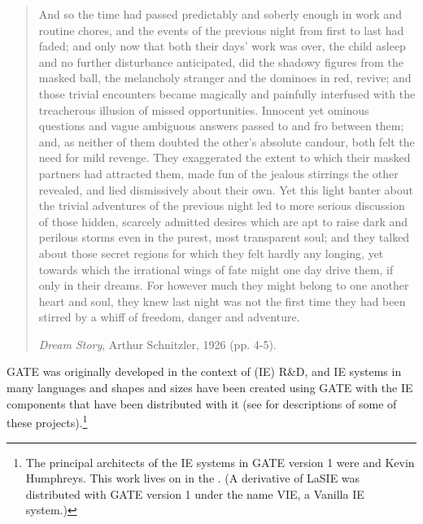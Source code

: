 %
%
%
%


\nnormalsize
\ifprintedbook 
\else
\begin{quote}
And so the time had passed predictably and soberly enough
in work and routine chores, and the events of the previous night from
first to last had faded; and only now that
both their days' work was over, the child asleep and
no further disturbance anticipated, did
the shadowy figures from the masked ball, the melancholy
stranger and the dominoes in red, revive; and those trivial encounters
became magically and painfully interfused with the treacherous illusion
of missed opportunities. Innocent yet ominous questions and
vague ambiguous answers passed to and fro between them; and,
as neither of them doubted the other's absolute candour, both felt
the need for mild revenge. They exaggerated the extent to which their
masked partners had attracted them, made fun of the jealous
stirrings the other revealed, and lied dismissively about their own.
Yet this light banter about the trivial adventures of the previous
night led to more serious discussion of those hidden, scarcely
admitted desires which are apt to raise dark and perilous storms even
in the purest, most transparent soul; and they talked about those secret
regions for which they felt hardly any longing, yet towards
which the irrational wings of fate might one day drive them, if
only in their dreams. For however much they might belong to one
another heart and soul, they knew last night was not the first
time they had been stirred by a whiff of freedom, danger and adventure.

{\it Dream Story}, Arthur Schnitzler, 1926 (pp. 4-5).
\end{quote}
\fi


GATE was originally developed in the context of
(IE) R\&D, and IE systems in many languages and shapes and sizes have
been created using GATE with the IE components that have been
distributed with it (see \cite{May00a} for descriptions of some of
these projects).\footnote{The principal architects of the IE systems
in GATE version 1 were
 and
Kevin Humphreys. This work lives on in the
.
(A derivative of
LaSIE was distributed with GATE version 1 under the name VIE, a Vanilla
IE system.)}

